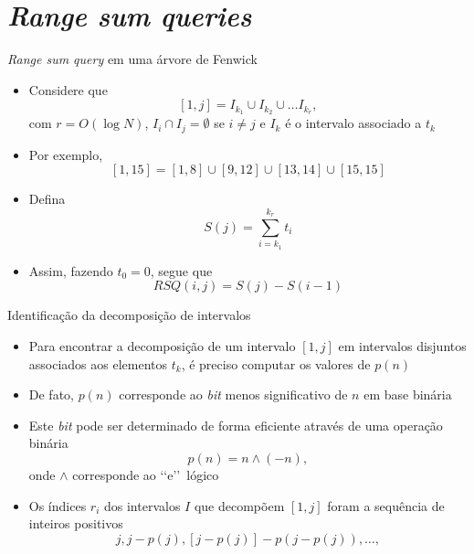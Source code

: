 \section{\it Range sum queries}

\begin{frame}[fragile]{\textit{Range sum query} em uma árvore de Fenwick}

    \begin{itemize}
        \item Considere que 
        \[
            [1, j] = I_{k_1} \cup I_{k_2} \cup \ldots I_{k_r},
        \]
        com $r = O(\log N)$, $I_i \cap I_j = \emptyset$ se $i\neq j$ e $I_k$ é o intervalo associado
        a $t_k$

        \item Por exemplo,
        \[
            [1, 15] = [1, 8]\cup [9, 12]\cup [13, 14]\cup [15, 15]
        \]

        \item Defina
        \[
            S(j) = \sum_{i = k_1}^{k_r} t_i
        \]

        \item Assim, fazendo $t_0 = 0$, segue que
        \[
            RSQ(i, j) = S(j) - S(i - 1)
        \]

    \end{itemize}

\end{frame}

\begin{frame}[fragile]{Identificação da decomposição de intervalos}

    \begin{itemize}
        \item Para encontrar a decomposição de um intervalo $[1, j]$ em intervalos disjuntos 
            associados aos elementos $t_k$, é preciso computar os valores de $p(n)$

        \item De fato, $p(n)$ corresponde ao \textit{bit} menos significativo de $n$ em base
            binária

        \item Este \textit{bit} pode ser determinado de forma eficiente através de uma operação
            binária
        \[
            p(n) = n \land (-n),
        \]
        onde $\land$ corresponde ao \lq\lq e\rq\rq\ lógico

        \item Os índices $r_i$ dos intervalos $I$ que decompõem $[1,j]$ foram a sequência
            de inteiros positivos 
        \[
            j, j - p(j), [j - p(j)] - p(j - p(j)), \ldots,
        \]
    \end{itemize}

\end{frame}

